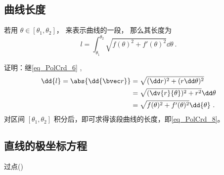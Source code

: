 \subsection{曲线长度}

若用 $\theta \in [\theta_1, \theta_2]$， 来表示曲线的一段， 那么其长度为
\begin{equation}\label{eq_PolCrd_8}
l = \int_{\theta_1}^{\theta_2} \sqrt{f(\theta)^2 + f'(\theta)^2} \dd{\theta}~.
\end{equation}

证明：继\autoref{eq_PolCrd_6} ,
\begin{align}
\dd{l} = \abs{\dd{\bvec r}} &=\sqrt{(\dd r)^2 + (r \dd \theta)^2} \\
&=\sqrt{(\dv {r}{\theta} )^2 + r^2} \dd \theta \\
&=\sqrt{f(\theta)^2 + f'(\theta)^2} \dd{\theta}~.
\end{align}
对区间 $[\theta_1,\theta_2]$ 积分后，即可求得该段曲线的长度，即\autoref{eq_PolCrd_8}。

\subsection{直线的极坐标方程}

过点()